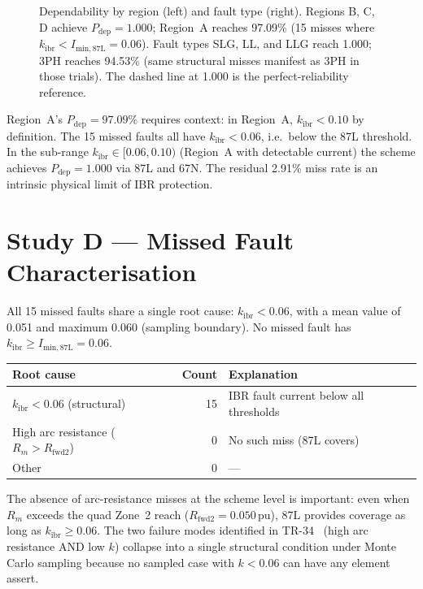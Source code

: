 \documentclass[11pt,a4paper]{article}
\begin{document}
\begin{figure}[htbp]
  \centering
  \resizebox{0.96\textwidth}{!}{}
  \caption{Dependability by region (left) and fault type (right).  Regions
           B, C, D achieve $P_\mathrm{dep}=1.000$; Region~A reaches 97.09\%
           (15 misses where $k_\mathrm{ibr}<I_\mathrm{min,87L}=0.06$).
           Fault types SLG, LL, and LLG reach 1.000; 3PH reaches 94.53\%
           (same structural misses manifest as 3PH in those trials).
           The dashed line at 1.000 is the perfect-reliability reference.}
  \label{fig:dependability}
\end{figure}

\noindent
Region~A's $P_\mathrm{dep}=97.09\%$ requires context: in Region~A,
$k_\mathrm{ibr}<0.10$ by definition.  The 15 missed faults all have
$k_\mathrm{ibr}<0.06$, i.e.\ below the 87L threshold.  In the sub-range
$k_\mathrm{ibr}\in[0.06,0.10)$ (Region~A with detectable current) the scheme
achieves $P_\mathrm{dep}=1.000$ via 87L and 67N.  The residual 2.91\% miss
rate is an intrinsic physical limit of IBR protection.

\section{Study D --- Missed Fault Characterisation}
\label{sec:studyD}

All 15 missed faults share a single root cause: $k_\mathrm{ibr}<0.06$, with
a mean value of 0.051 and maximum 0.060 (sampling boundary).  No missed fault
has $k_\mathrm{ibr}\geq I_\mathrm{min,87L}=0.06$.

\begin{center}
\begin{tabular}{@{}lrl@{}}
\toprule
Root cause & Count & Explanation\\
\midrule
$k_\mathrm{ibr} < 0.06$ (structural) & 15 & IBR fault current below all thresholds\\
High arc resistance ($R_m > R_\mathrm{fwd2}$) & 0 & No such miss (87L covers)\\
Other & 0 & ---\\
\bottomrule
\end{tabular}
\end{center}

\medskip\noindent
The absence of arc-resistance misses at the scheme level is important: even
when $R_m$ exceeds the quad Zone~2 reach ($R_\mathrm{fwd2}=0.050$\,pu), 87L
provides coverage as long as $k_\mathrm{ibr}\geq0.06$.  The two failure modes
identified in TR-34~\cite{SAMBP_TR35} (high arc resistance AND low $k$) collapse
into a single structural condition under Monte Carlo sampling because no sampled
case with $k<0.06$ can have any element assert.
\end{document}
